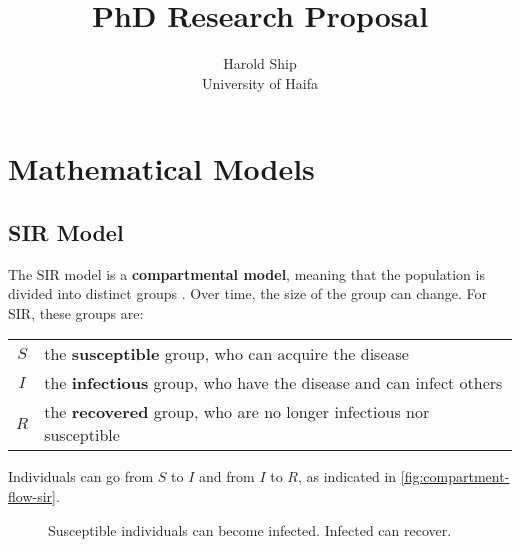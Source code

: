\documentclass[11pt,a4paper,titlepage]{article}
\title{PhD Research Proposal}
\author{Harold Ship \\ University of Haifa}
\theoremstyle{definition}
\begin{document}

\maketitle \clearpage
\tableofcontents \clearpage
\iffalse %
\listoffigures \clearpage
\listoftables \clearpage
\fi
\printglossary[type=\acronymtype] \clearpage


\setcounter{page}{1}

%

\section{Mathematical Models}
\label{sec:math-models}

\subsection{SIR Model}
\label{subsec:math-models:sir}

The SIR model is a \textbf{compartmental model},
meaning that the population is divided into distinct groups \autocite{keeling2011modeling}.
Over time,
the size of the group can change.
For SIR,
these groups are:

\begin{tabular}{cl}
    $S$ & the \textbf{susceptible} group,%
    who can acquire the disease\\%
    $I$ & the \textbf{infectious} group,%
    who have the disease and can infect others\\%
    $R$ & the \textbf{recovered} group,%
    who are no longer infectious nor susceptible
\end{tabular}

Individuals can go from $S$ to $I$ and from $I$ to $R$,
as indicated in \autoref{fig:compartment-flow-sir}.

\begin{figure}
    \caption{
        \label{fig:compartment-flow-sir}
        Susceptible individuals can become infected.
        Infected can recover.
    }
\end{figure}
\end{document}
